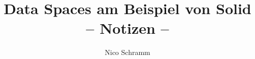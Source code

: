 
\title{Data Spaces am Beispiel von Solid\\
       -- Notizen --}
\author{Nico Schramm}

\newcommand{\subject}{Handout zum Oberseminar-Vortrag}
